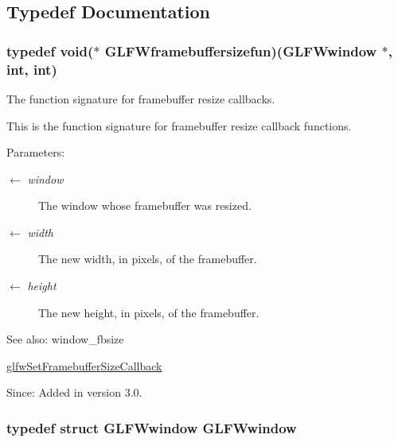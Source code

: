 \subsection{Typedef Documentation}
\hypertarget{group__window_g311bb32e578aa240b6464af494debffc}{
\subsubsection[GLFWframebuffersizefun]{\setlength{\rightskip}{0pt plus 5cm}typedef void($\ast$  {\bf GLFWframebuffersizefun})({\bf GLFWwindow} $\ast$, int, int)}}
\label{group__window_g311bb32e578aa240b6464af494debffc}


The function signature for framebuffer resize callbacks. 

This is the function signature for framebuffer resize callback functions.

\begin{Desc}
\item[Parameters:]
\begin{description}
\item[\mbox{$\leftarrow$} {\em window}]The window whose framebuffer was resized. \item[\mbox{$\leftarrow$} {\em width}]The new width, in pixels, of the framebuffer. \item[\mbox{$\leftarrow$} {\em height}]The new height, in pixels, of the framebuffer.\end{description}
\end{Desc}
\begin{Desc}
\item[See also:]window\_\-fbsize 

\hyperlink{group__window_gd766bcdb4465f9c6c62e5d8ca7cfba56}{glfwSetFramebufferSizeCallback}\end{Desc}
\begin{Desc}
\item[Since:]Added in version 3.0. \end{Desc}
\hypertarget{group__window_g3c96d80d363e67d13a41b5d1821f3242}{
\subsubsection[GLFWwindow]{\setlength{\rightskip}{0pt plus 5cm}typedef struct {\bf GLFWwindow} {\bf GLFWwindow}}}
\label{group__window_g3c96d80d363e67d13a41b5d1821f3242}


